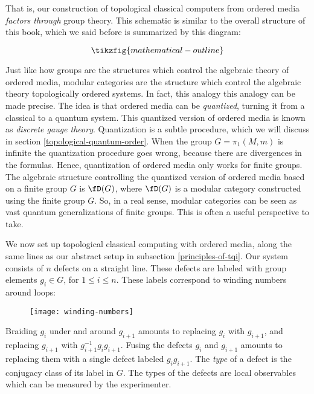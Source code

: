 That is, our construction of topological classical computers from ordered media {\em factors through} group theory. This schematic is similar to the overall structure of this book, which we said before is summarized by this diagram:

\begin{equation*}
\tikzfig{mathematical-outline}
\end{equation*}

\begin{rem}
Just like how groups are the structures which control the algebraic theory of ordered media, modular categories are the structure which control the algebraic theory topologically ordered systems. In fact, this analogy this analogy can be made precise. The idea is that ordered media can be {\em quantized}, turning it from a classical to a quantum system. This quantized version of ordered media is known as {\em discrete gauge theory}. Quantization is a subtle procedure, which we will discuss in section \ref{topological-quantum-order}. When the group $G=\pi_1(M,m)$ is infinite the quantization procedure goes wrong, because there are divergences in the formulas. Hence, quantization of ordered media only works for finite groups. The algebraic structure controlling the quantized version of ordered media based on a finite group $G$ is $\fD(G)$, where $\fD(G)$ is a modular category constructed using the finite group $G$. So, in a real sense, modular categories can be seen as vast quantum generalizations of finite groups. This is often a useful perspective to take.
\end{rem}

We now set up topological classical computing with ordered media, along the same lines as our abstract setup in subsection \ref{principles-of-tqi}. Our system consists of $n$ defects on a straight line. These defects are labeled with group elements $g_i\in G$, for $1\leq i \leq n$. These labels correspond to winding numbers around loops:

\begin{figure}
\begin{center}
\texttt{[image: winding-numbers]}
\label{winding-numbers}
\end{center}
\end{figure}

Braiding $g_i$ under and around $g_{i+1}$ amounts to replacing $g_i$ with $g_{i+1}$, and replacing $g_{i+1}$ with $g_{i+1}^{-1}g_i g_{i+1}$. Fusing the defects $g_{i}$ and $g_{i+1}$ amounts to replacing them with a single defect labeled $g_{i}g_{i+1}$. The \textit{type} of a defect is the conjugacy class of its label in $G$. The types of the defects are local observables which can be measured by the experimenter.

